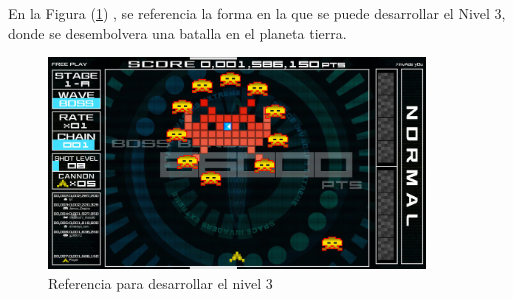 \documentclass{article}
\begin{document}
En la Figura (\ref{fig:nivel3}) \cite{invaders} , se referencia la forma en la que se puede desarrollar el Nivel 3, donde se desembolvera una batalla en el planeta tierra.

\begin{figure}[h]
\includegraphics[width=10cm]{NIvel 3.jpg}
\centering
\caption{Referencia para desarrollar el nivel 3}
\label{fig:nivel3}
\end{figure}

\newpage



\end{document}
